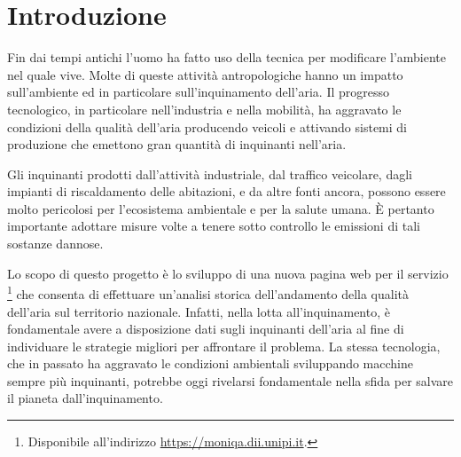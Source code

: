\chapter{Introduzione}

Fin dai tempi antichi l'uomo ha fatto uso della tecnica per modificare
l'ambiente nel quale vive. Molte di queste attività antropologiche hanno un
impatto sull'ambiente ed in particolare sull'inquinamento dell'aria. Il
progresso tecnologico, in particolare nell'industria e nella mobilità, ha
aggravato le condizioni della qualità dell'aria producendo veicoli e attivando
sistemi di produzione che emettono gran quantità di inquinanti nell'aria.

Gli inquinanti prodotti dall'attività industriale, dal traffico veicolare, dagli
impianti di riscaldamento delle abitazioni, e da altre fonti ancora, possono
essere molto pericolosi per l'ecosistema ambientale e per la salute umana. È
pertanto importante adottare misure volte a tenere sotto controllo le emissioni
di tali sostanze dannose.

Lo scopo di questo progetto è lo sviluppo di una nuova pagina web per il
servizio \MonIQA\footnote{Disponibile all'indirizzo
\url{https://moniqa.dii.unipi.it}.} che consenta di effettuare un'analisi
storica dell'andamento della qualità dell'aria sul territorio nazionale.
Infatti, nella lotta all'inquinamento, è fondamentale avere a disposizione dati
sugli inquinanti dell'aria al fine di individuare le strategie migliori per
affrontare il problema. La stessa tecnologia, che in passato ha aggravato le
condizioni ambientali sviluppando macchine sempre più inquinanti, potrebbe oggi
rivelarsi fondamentale nella sfida per salvare il pianeta dall'inquinamento.



